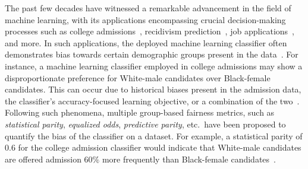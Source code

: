 \label{chapter:fif}

The past few decades have witnessed a remarkable advancement in the field of machine learning, with its applications encompassing crucial decision-making processes such as college admissions~\cite{martinez2021using}, recidivism prediction~\cite{tollenaar2013method}, job applications~\cite{ajunwa2016hiring}, and more.  In such applications, the deployed machine learning classifier often demonstrates bias towards certain demographic groups present in the data~\cite{dwork2012fairness}. For instance, a machine learning classifier employed in college admissions may show a disproportionate preference for White-male candidates over Black-female candidates. This can occur due to historical biases present in the admission data, the classifier's accuracy-focused learning objective, or a combination of the two~\cite{landy1978correlates,zliobaite2015relation,berk2019accuracy}. Following such phenomena, multiple group-based fairness metrics, such as \textit{statistical parity}, \textit{equalized odds}, \textit{predictive parity}, etc.\ have been proposed to quantify the bias of the classifier on a dataset.  For example, a statistical parity of $ 0.6 $ for the college admission classifier would indicate that White-male candidates are offered admission $ 60\% $ more frequently than Black-female candidates~\cite{garg2020fairness,besse2021survey}.


